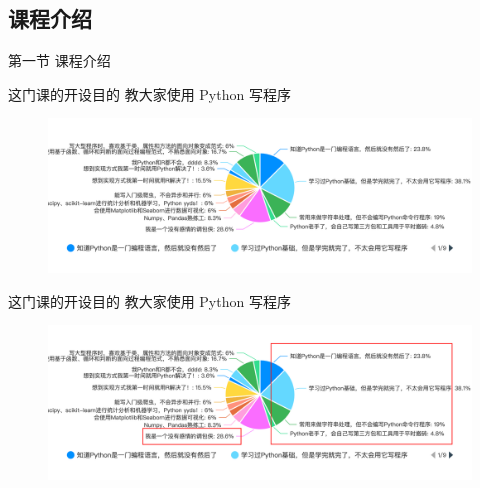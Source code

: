 \subsection{课程介绍}
\begin{frame}[standout] 第一节 \quad 课程介绍 \end{frame}



\begin{frame}{这门课的开设目的}
    教大家使用 Python 写程序
    \begin{figure}
        \centering
        \includegraphics[width=15cm]{Images/level.png}
    \end{figure}
\end{frame}



\begin{frame}{这门课的开设目的}
    教大家使用 Python 写程序
    \begin{figure}
        \centering
        \includegraphics[width=15cm]{Images/level2.png}
    \end{figure}
\end{frame}



